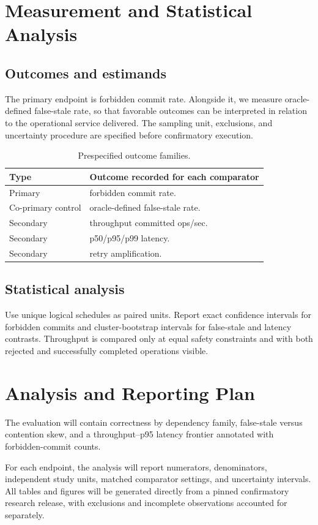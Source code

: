 \documentclass[11pt,a4paper]{article}
\begin{document}
\section{Measurement and Statistical Analysis}
\subsection{Outcomes and estimands}
The primary endpoint is forbidden commit rate. Alongside it, we measure oracle-defined false-stale rate, so that favorable outcomes can be interpreted in relation to the operational service delivered. The sampling unit, exclusions, and uncertainty procedure are specified before confirmatory execution.
\begin{table}[ht]
\centering\footnotesize
\caption{Prespecified outcome families.}
\begin{tabularx}{\linewidth}{@{}lX@{}}\toprule
Type & Outcome recorded for each comparator \\ \midrule
Primary & forbidden commit rate. \\ 
Co-primary control & oracle-defined false-stale rate. \\ 
Secondary & throughput committed ops/sec. \\ 
Secondary & p50/p95/p99 latency. \\ 
Secondary & retry amplification. \\ 
\bottomrule\end{tabularx}
\end{table}

\subsection{Statistical analysis}
Use unique logical schedules as paired units. Report exact confidence intervals for forbidden commits and cluster-bootstrap intervals for false-stale and latency contrasts. Throughput is compared only at equal safety constraints and with both rejected and successfully completed operations visible.

\section{Analysis and Reporting Plan}
The evaluation will contain correctness by dependency family, false-stale versus contention skew, and a throughput–p95 latency frontier annotated with forbidden-commit counts.

For each endpoint, the analysis will report numerators, denominators, independent study units, matched comparator settings, and uncertainty intervals. All tables and figures will be generated directly from a pinned confirmatory research release, with exclusions and incomplete observations accounted for separately.
\end{document}
